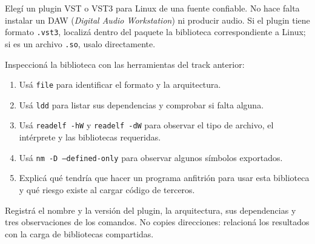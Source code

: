 \documentclass[11pt,a4paper]{article}
\begin{document}
Elegí un plugin VST o VST3 para Linux de una fuente confiable. No hace falta
instalar un DAW (\emph{Digital Audio Workstation}) ni producir audio. Si el
plugin tiene formato \texttt{.vst3}, localizá dentro del paquete la biblioteca
correspondiente a Linux; si es un archivo \texttt{.so}, usalo directamente.

Inspeccioná la biblioteca con las herramientas del track anterior:

\begin{enumerate}[leftmargin=*]
  \item Usá \texttt{file} para identificar el formato y la arquitectura.
  \item Usá \texttt{ldd} para listar sus dependencias y comprobar si falta
  alguna.
  \item Usá \texttt{readelf -hW} y \texttt{readelf -dW} para observar el tipo
  de archivo, el intérprete y las bibliotecas requeridas.
  \item Usá \texttt{nm -D --defined-only} para observar algunos símbolos
  exportados.
  \item Explicá qué tendría que hacer un programa anfitrión para usar esta
  biblioteca y qué riesgo existe al cargar código de terceros.
\end{enumerate}

Registrá el nombre y la versión del plugin, la arquitectura, sus dependencias
y tres observaciones de los comandos. No copies direcciones: relacioná los
resultados con la carga de bibliotecas compartidas.
\end{document}
